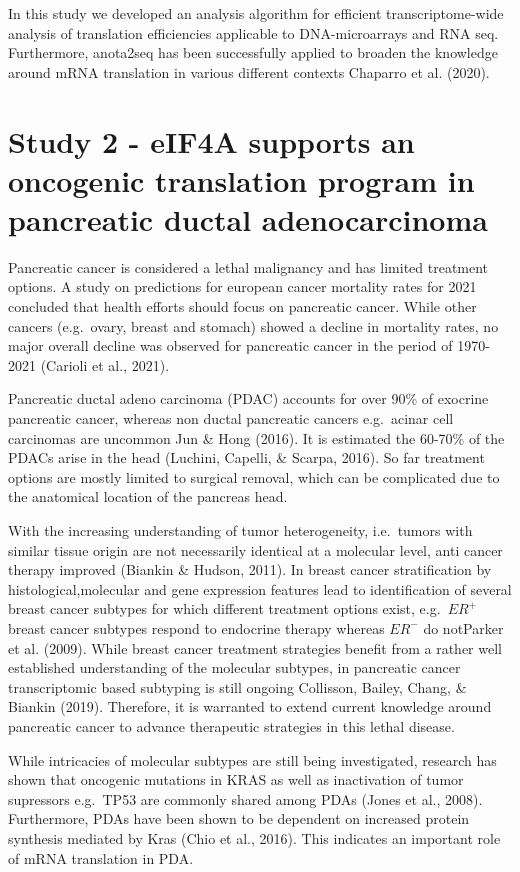 \documentclass[
  12pt,
  openany]{book}
\begin{document}
In this study we developed an analysis algorithm for efficient transcriptome-wide analysis of translation efficiencies applicable to DNA-microarrays and RNA seq. Furthermore, anota2seq has been successfully applied to broaden the knowledge around mRNA translation in various different contexts Chaparro et al. (2020).
\newline

\section{Study 2 - eIF4A supports an oncogenic translation program in pancreatic ductal adenocarcinoma}

Pancreatic cancer is considered a lethal malignancy and has limited treatment options. A study on predictions for european cancer mortality rates for 2021 concluded that health efforts should focus on pancreatic cancer. While other cancers (e.g.~ovary, breast and stomach) showed a decline in mortality rates, no major overall decline was observed for pancreatic cancer in the period of 1970-2021 (Carioli et al., 2021).

Pancreatic ductal adeno carcinoma (PDAC) accounts for over 90\% of exocrine pancreatic cancer, whereas non ductal pancreatic cancers e.g.~acinar cell carcinomas are uncommon Jun \& Hong (2016). It is estimated the 60-70\% of the PDACs arise in the head (Luchini, Capelli, \& Scarpa, 2016). So far treatment options are mostly limited to surgical removal, which can be complicated due to the anatomical location of the pancreas head.

With the increasing understanding of tumor heterogeneity, i.e.~tumors with similar tissue origin are not necessarily identical at a molecular level, anti cancer therapy improved (Biankin \& Hudson, 2011). In breast cancer stratification by histological,molecular and gene expression features lead to identification of several breast cancer subtypes for which different treatment options exist, e.g.~\(ER^+\) breast cancer subtypes respond to endocrine therapy whereas \(ER^-\) do notParker et al. (2009). While breast cancer treatment strategies benefit from a rather well established understanding of the molecular subtypes, in pancreatic cancer transcriptomic based subtyping is still ongoing Collisson, Bailey, Chang, \& Biankin (2019). Therefore, it is warranted to extend current knowledge around pancreatic cancer to advance therapeutic strategies in this lethal disease.

While intricacies of molecular subtypes are still being investigated, research has shown that oncogenic mutations in KRAS as well as inactivation of tumor supressors e.g.~TP53 are commonly shared among PDAs (Jones et al., 2008). Furthermore, PDAs have been shown to be dependent on increased protein synthesis mediated by Kras (Chio et al., 2016). This indicates an important role of mRNA translation in PDA.
\end{document}
